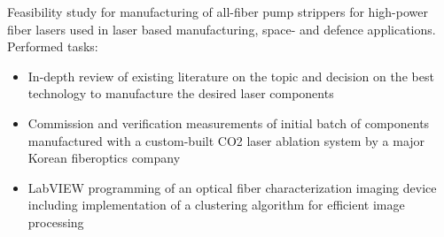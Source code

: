 \documentclass[11pt,a4paper,sans]{moderncv} %
\begin{document}
{Feasibility study for manufacturing of all-fiber pump strippers for high-power fiber lasers used in laser based manufacturing, space- and defence applications.
Performed tasks:
\begin{itemize}
\item In-depth review of existing literature on the topic and decision on the best technology to manufacture the desired laser components
\item Commission and verification measurements of initial batch of components manufactured with a custom-built CO2 laser ablation system by a major Korean fiberoptics company
\item LabVIEW programming of an optical fiber characterization imaging device including implementation of a clustering algorithm for efficient image processing
\end{itemize}}
\end{document}
